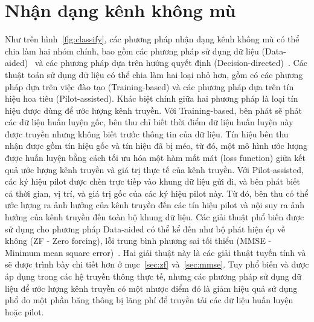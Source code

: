 \section{Nhận dạng kênh không mù}
Như trên hình~\ref{fig:classify}, các phương pháp nhận dạng kênh không mù có thể chia làm hai nhóm chính, bao gồm các phương pháp sử dụng dữ liệu (Data-aided)~\cite{vilas2022} và các phương pháp dựa trên hướng quyết định (Decision-directed)~\cite{Ozdemir2007}. Các thuật toán sử dụng dữ liệu có thể chia làm hai loại nhỏ hơn, gồm có các phương pháp dựa trên việc đào tạo (Training-based) và các phương pháp dựa trên tín hiệu hoa tiêu (Pilot-assisted). Khác biệt chính giữa hai phương pháp là loại tín hiệu được dùng để ước lượng kênh truyền. Với Training-based, bên phát sẽ phát các dữ liệu huấn luyện gốc, bên thu chỉ biết thời điểm dữ liệu huấn luyện này được truyền nhưng không biết trước thông tin của dữ liệu. Tín hiệu bên thu nhận được gồm tín hiệu gốc và tín hiệu đã bị méo, từ đó, một mô hình ước lượng được huấn luyện bằng cách tối ưu hóa một hàm mất mát (loss function) giữa kết quả ước lượng kênh truyền và giá trị thực tế của kênh truyền. Với Pilot-assisted, các ký hiệu pilot được chèn trực tiếp vào khung dữ liệu gửi đi, và bên phát biết cả thời gian, vị trí, và giá trị gốc của các ký hiệu pilot này. Từ đó, bên thu có thể ước lượng ra ảnh hưởng của kênh truyền đến các tín hiệu pilot và nội suy ra ảnh hưởng của kênh truyền đến toàn bộ khung dữ liệu. Các giải thuật phổ biến được sử dụng cho phương pháp Data-aided có thể kể đến như bộ phát hiện ép về không (ZF - Zero forcing), lỗi trung bình phương sai tối thiểu (MMSE - Minimum mean square error)~\cite{Jiang2011}. Hai giải thuật này là các giải thuật tuyến tính và sẽ được trình bày chi tiết hơn ở mục~\ref{sec:zf} và~\ref{sec:mmse}. Tuy phổ biến và được áp dụng trong các hệ truyền thông thực tế, nhưng các phương pháp sử dụng dữ liệu để ước lượng kênh truyền có một nhược điểm đó là giảm hiệu quả sử dụng phổ do một phần băng thông bị lãng phí để truyền tải các dữ liệu huấn luyện hoặc pilot. 

